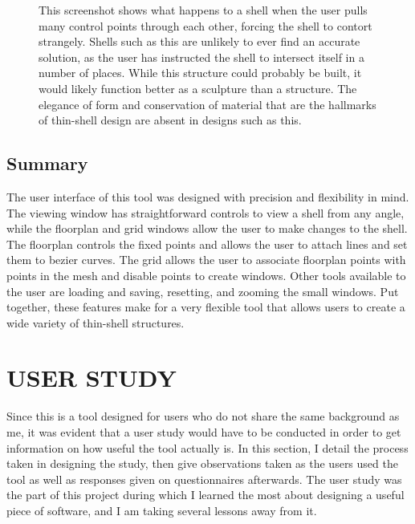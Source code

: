 \documentclass{thesis}
\begin{document}
\begin{figure}
\caption[A tangled mess]{This screenshot shows what happens to a shell when the user pulls many control points through each other,
forcing the shell to contort strangely.  Shells such as this are unlikely to ever find an accurate solution, as the user has
instructed the shell to intersect itself in a number of places.  While this structure could probably be built, it would likely function
better as a sculpture than a structure.  The elegance of form and conservation of material that are the hallmarks of thin-shell
design are absent in designs such as this.}
\label{fig:tangle1}
\end{figure}

\section{Summary}
The user interface of this tool was designed with precision and flexibility in mind.  The viewing window has straightforward controls
to view a shell from any angle, while the floorplan and grid windows allow the user to make changes to the shell.  The floorplan
controls the fixed points and allows the user to attach lines and set them to bezier curves.  The grid allows the user to associate
floorplan points with points in the mesh and disable points to create windows.  Other tools available to the user are loading and
saving, resetting, and zooming the small windows.  Put together, these features make for a very flexible tool that allows users to
create a wide variety of thin-shell structures.


\chapter{USER STUDY}
Since this is a tool designed for users who do not share the same background as me, it was evident that a user study would have to be
conducted in order to get information on how useful the tool actually is.  In this section, I detail the process taken in designing
the study, then give observations taken as the users used the tool as well as responses given on questionnaires afterwards.  The user
study was the part of this project during which I learned the most about designing a useful piece of software, and I am taking several
lessons away from it.
\end{document}

